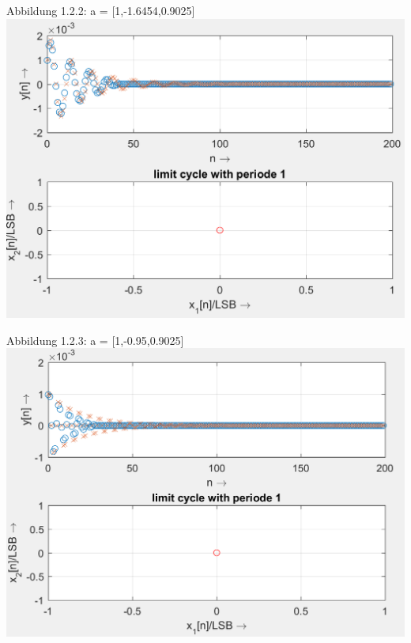 \begin{center}
Abbildung 1.2.2: a = [1,-1.6454,0.9025]\\
\includegraphics[scale=0.9]{../Tab2_2.PNG}
\end{center}

\newpage

\begin{center}
Abbildung 1.2.3: a = [1,-0.95,0.9025]\\
\includegraphics[scale=0.9]{../Tab2_3.PNG}
\end{center}

